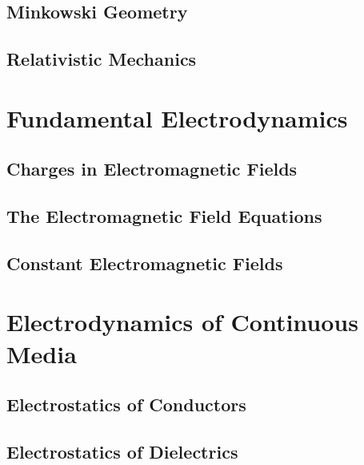 \documentclass[
    ebook,
    11pt,
    oneside,
    onecolumn,
    openright,
    final
]{memoir}
\numberwithin{equation}{section}
\begin{document}
\chapter{Minkowski Geometry}

\chapter{Relativistic Mechanics}

\part{Fundamental Electrodynamics}

\chapter[Charges in EM Fields]{Charges in Electromagnetic Fields}
\label{ch:05a}







\chapter[The EM Field Equations]{The Electromagnetic Field Equations}
\label{ch:06a}


% 

\chapter[Constant EM Fields]{Constant Electromagnetic Fields}
\label{ch:07a}

\part{Electrodynamics of Continuous Media}

\chapter{Electrostatics of Conductors}

\chapter{Electrostatics of Dielectrics}
\end{document}
